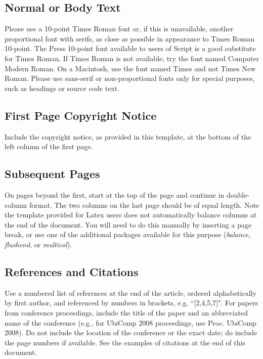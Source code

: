 \documentclass{ubicomp2012}
\begin{document}
\subsection{Normal or Body Text}

Please use a 10-point Times Roman font or, if this is unavailable,
another proportional font with serifs, as close as possible in
appearance to Times Roman 10-point. The Press 10-point font available
to users of Script is a good substitute for Times Roman. If Times
Roman is not available, try the font named Computer Modern Roman. On a
Macintosh, use the font named Times and not Times New Roman. Please
use sans-serif or non-proportional fonts only for special purposes,
such as headings or source code text.

\subsection{First Page Copyright Notice}

Include the copyright notice, as provided in this template, at the bottom of the left column of the first page.
\subsection{Subsequent Pages}

On pages beyond the first, start at the top of the page and continue
in double-column format.  The two columns on the last page should be
of equal length. Note the template provided for Latex users does not automatically balance columns at the end of the document. You will need to do this manually by inserting a page break, or use one of the additional packages available for this purpose (\emph{balance}, \emph{flushend}, or \emph{multicol}).

\subsection{References and Citations}

Use a numbered list of references at the end of the article, ordered
alphabetically by first author, and referenced by numbers in brackets, e.g.
``[2,4,5,7]". For papers from conference proceedings, include the title
of the paper and an abbreviated name of the conference (e.g., for
UbiComp 2008 proceedings, use Proc. UbiComp 2008). Do not include
the location of the conference or the exact date; do include the page
numbers if available. See the examples of citations at the end of this
document.
\end{document}
